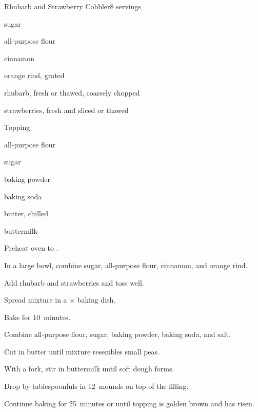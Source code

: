 \begin{recipe}{Rhubarb and Strawberry Cobbler}{}{8 servings}

\begin{ingredients}
\item \C{1\quarter} sugar
\item {} all-purpose flour
\item \tp{1\half} cinnamon
\item \tp{1\half} orange rind, grated
\item {} rhubarb, fresh or thawed, coarsely chopped
\item {} strawberries, fresh and sliced or thawed
\end{ingredients}
Topping
\begin{ingredients}
\item \C{1\half} all-purpose flour
\item {} sugar
\item \tp{1\half} baking powder
\item \tp{\half} baking soda
\item {} butter, chilled
\item {} buttermilk
\end{ingredients}

\begin{directions}
\item Preheat oven to .
\item In a large bowl, combine \C{1\quarter} sugar,  all-purpose flour, cinnamon, and orange rind.
\item Add rhubarb and strawberries and toss well.
\item Spread mixture in a $\times$ baking dish.
\item Bake for 10~minutes.
\item Combine \C{1\half} all-purpose flour,  sugar, baking powder, baking soda, and salt.
\item Cut in butter until mixture resembles small peas.
\item With a fork, stir in buttermilk until soft dough forms.
\item Drop by tablespoonfuls in 12~mounds on top of the filling.
\item Continue baking for 25~minutes or until topping is golden brown and has risen.  
\end{directions}

\end{recipe}
